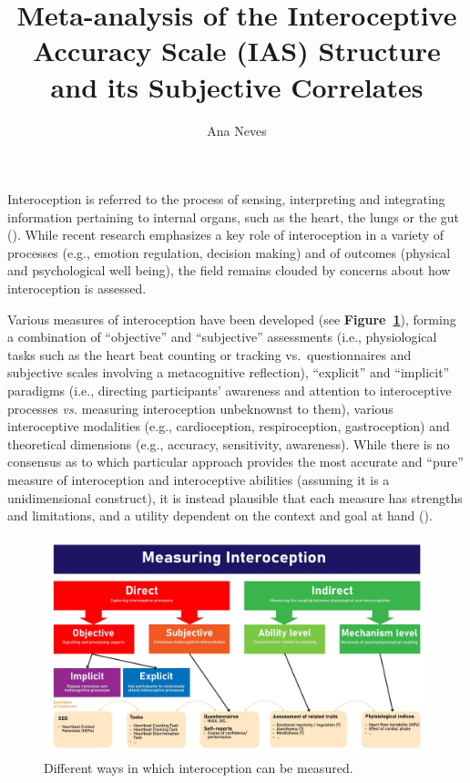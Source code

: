 \documentclass[
  man,
  floatsintext,
  longtable,
  nolmodern,
  notxfonts,
  notimes,
  colorlinks=true,linkcolor=blue,citecolor=blue,urlcolor=blue]{apa7}
\title{Meta-analysis of the Interoceptive Accuracy Scale (IAS) Structure
and its Subjective Correlates}
\author{Ana Neves}
\affiliation{
{School of Psychology, University of Sussex}}
\begin{document}
\maketitle


\setcounter{secnumdepth}{-\maxdimen} %

\setlength\LTleft{0pt}

\resetlinenumber[1]

Interoception is referred to the process of sensing, interpreting and
integrating information pertaining to internal organs, such as the
heart, the lungs or the gut (). While recent research emphasizes a key role of interoception in
a variety of processes (e.g., emotion regulation, decision making) and
of outcomes (physical and psychological well being), the field remains
clouded by concerns about how interoception is assessed.

Various measures of interoception have been developed (see
\textbf{Figure~\ref{fig-measures}}), forming a combination of
``objective'' and ``subjective'' assessments (i.e., physiological tasks
such as the heart beat counting or tracking vs.~questionnaires and
subjective scales involving a metacognitive reflection), ``explicit''
and ``implicit'' paradigms (i.e., directing participants' awareness and
attention to interoceptive processes \emph{vs.} measuring interoception
unbeknownst to them), various interoceptive modalities (e.g.,
cardioception, respiroception, gastroception) and theoretical dimensions
(e.g., accuracy, sensitivity, awareness). While there is no consensus as
to which particular approach provides the most accurate and ``pure''
measure of interoception and interoceptive abilities (assuming it is a
unidimensional construct), it is instead plausible that each measure has
strengths and limitations, and a utility dependent on the context and
goal at hand ().

\begin{figure}[!htbp]

{\caption{{Different ways in which interoception can be
measured.}{\label{fig-measures}}}}

\includegraphics[width=1\textwidth,height=\textheight]{figures/MeasuringInteroception.jpg}

\end{figure}
\end{document}
